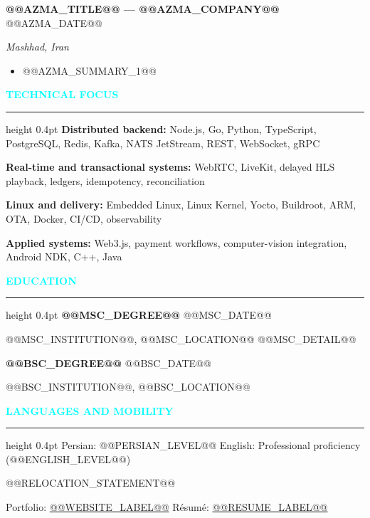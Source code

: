 \documentclass[10pt,a4paper]{article}
\newcommand{\sectiontitle}[1]{\vspace{0.42em}\textcolor{cyan}{\textsf{\bfseries\fontsize{9}{10}\selectfont #1}}\par\vspace{0.08em}\hrule height 0.4pt\vspace{0.2em}}
\newcommand{\role}[3]{\vspace{0.08em}\textbf{#1} \hfill \textcolor{muted}{#2}\par\textit{#3}\par}
\begin{document}
\role{@@AZMA_TITLE@@ --- @@AZMA_COMPANY@@}{@@AZMA_DATE@@}{Mashhad, Iran}
\begin{itemize}
  \item @@AZMA_SUMMARY_1@@
\end{itemize}

\sectiontitle{TECHNICAL FOCUS}
\textbf{Distributed backend:} Node.js, Go, Python, TypeScript, PostgreSQL, Redis, Kafka, NATS JetStream, REST, WebSocket, gRPC\par
\textbf{Real-time and transactional systems:} WebRTC, LiveKit, delayed HLS playback, ledgers, idempotency, reconciliation\par
\textbf{Linux and delivery:} Embedded Linux, Linux Kernel, Yocto, Buildroot, ARM, OTA, Docker, CI/CD, observability\par
\textbf{Applied systems:} Web3.js, payment workflows, computer-vision integration, Android NDK, C++, Java

\sectiontitle{EDUCATION}
\textbf{@@MSC_DEGREE@@} \hfill @@MSC_DATE@@\par
@@MSC_INSTITUTION@@, @@MSC_LOCATION@@ \textbar{} @@MSC_DETAIL@@\par
\textbf{@@BSC_DEGREE@@} \hfill @@BSC_DATE@@\par
@@BSC_INSTITUTION@@, @@BSC_LOCATION@@

\sectiontitle{LANGUAGES AND MOBILITY}
Persian: @@PERSIAN_LEVEL@@ \textbar{} English: Professional proficiency (@@ENGLISH_LEVEL@@)\par
@@RELOCATION_STATEMENT@@

\vfill
\textcolor{muted}{Portfolio: \href{@@WEBSITE_URL@@}{@@WEBSITE_LABEL@@} \textbar{} Résumé: \href{@@RESUME_URL@@}{@@RESUME_LABEL@@}}
\end{document}

